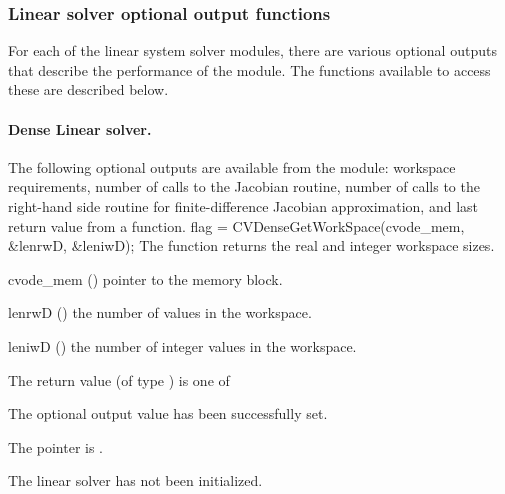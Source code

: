 
\subsubsection{Linear solver optional output functions}\label{sss:linsolv_io}

For each of the linear system solver modules, there are various optional 
outputs that describe the performance of the module. The functions available 
to access these are described below.

\noindent\paragraph{\bf Dense Linear solver.}
The following optional outputs are available from the {\cvdense} module:
workspace requirements, number of calls to the Jacobian routine, number of 
calls to the right-hand side routine for finite-difference Jacobian approximation,
and last return value from a {\cvdense} function.
{
  flag = CVDenseGetWorkSpace(cvode\_mem, \&lenrwD, \&leniwD);
}
{
  The function  returns the
  {\cvdense} real and integer workspace sizes.
}
{
  \begin{args}
  \item[cvode\_mem] ()
    pointer to the {\cvode} memory block.
  \item[lenrwD] ()
    the number of  values in the {\cvdense} workspace.
  \item[leniwD] ()
    the number of integer values in the {\cvdense} workspace.
  \end{args}
}
{
  The return value  (of type ) is one of
  \begin{args}
  \item[\Id{CVDENSE\_SUCCESS}] 
    The optional output value has been successfully set.
  \item[\Id{CVDENSE\_MEM\_NULL}]
    The  pointer is .
  \item[\Id{CVDENSE\_LMEM\_NULL}]
    The {\cvdense} linear solver has not been initialized.
  \end{args}
}
